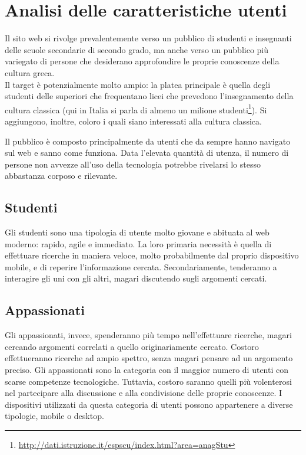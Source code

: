 \section{Analisi delle caratteristiche utenti}
Il sito web si rivolge prevalentemente verso un pubblico di studenti e insegnanti delle scuole secondarie di secondo grado, ma anche verso un pubblico più variegato di persone che desiderano approfondire le proprie conoscenze della cultura greca.\\
Il target è potenzialmente molto ampio: la platea principale è quella degli studenti delle superiori che frequentano licei che prevedono l'insegnamento della cultura classica (qui in Italia si parla di almeno un milione studenti\footnote{\url{http://dati.istruzione.it/espscu/index.html?area=anagStu}}). Si aggiungono, inoltre, coloro i quali siano interessati alla cultura classica.

Il pubblico è composto principalmente da utenti che da sempre hanno navigato sul web e sanno come funziona. Data l'elevata quantità di utenza, il numero di persone non avvezze all'uso della tecnologia potrebbe rivelarsi lo stesso abbastanza corposo e rilevante.

\subsection{Studenti}
Gli studenti sono una tipologia di utente molto giovane e abituata al web moderno: rapido, agile e immediato. La loro primaria necessità è quella di effettuare ricerche in maniera veloce, molto probabilmente dal proprio dispositivo mobile, e di reperire l'informazione cercata.
Secondariamente, tenderanno a interagire gli uni con gli altri, magari discutendo sugli argomenti cercati.

\subsection{Appassionati}
Gli appassionati, invece, spenderanno più tempo nell'effettuare ricerche, magari cercando argomenti correlati a quello originariamente cercato. Costoro effettueranno ricerche ad ampio spettro, senza magari pensare ad un argomento preciso. Gli appassionati sono la categoria con il maggior numero di utenti con scarse competenze tecnologiche. Tuttavia, costoro saranno quelli più volenterosi nel partecipare alla discussione e alla condivisione delle proprie conoscenze. I dispositivi utilizzati da questa categoria di utenti possono appartenere a diverse tipologie, mobile o desktop. 

